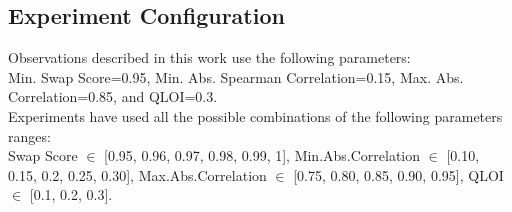 \subsection{Experiment Configuration}
\label{section:cfg}
Observations described in this work use the following parameters:\\
Min. Swap Score=0.95, Min. Abs. Spearman Correlation=0.15, Max. Abs. Correlation=0.85, and QLOI=0.3.
\\

Experiments have used all the possible combinations of the following parameters ranges:\\
Swap Score $\in$ [0.95, 0.96, 0.97, 0.98, 0.99, 1], Min.Abs.Correlation $\in$ [0.10, 0.15, 0.2, 0.25, 0.30], Max.Abs.Correlation $\in$ [0.75, 0.80, 0.85, 0.90, 0.95], QLOI $\in$ [0.1, 0.2, 0.3].